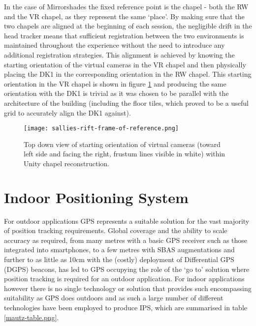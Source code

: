 In the case of Mirrorshades the fixed reference point is the chapel - both the RW and the VR chapel, as they represent the same `place'. By making sure that the two chapels are aligned at the beginning of each session, the negligible drift in the head tracker means that sufficient registration between the two environments is maintained throughout the experience without the need to introduce any additional registration strategies. This alignment is achieved by knowing the starting orientation of the virtual cameras in the VR chapel and then physically placing the DK1 in the corresponding orientation in the RW chapel. This starting orientation in the VR chapel is shown in figure \ref{sallies-rift-frame-of-reference.png} and producing the same orientation with the DK1 is trivial as it was chosen to be parallel with the architecture of the building (including the floor tiles, which proved to be a useful grid to accurately align the DK1 against).

\begin{figure}
	\begin{center}
		\texttt{[image: sallies-rift-frame-of-reference.png]}
		\caption{Top down view of starting orientation of virtual cameras (toward left side and facing the right, frustum lines visible in white) within Unity chapel reconstruction.}
		\label{sallies-rift-frame-of-reference.png}
	\end{center}
\end{figure}


\section{Indoor Positioning System}

For outdoor applications GPS represents a suitable solution for the vast majority of position tracking requirements. Global coverage and the ability to scale accuracy as required, from many metres with a basic GPS receiver such as those integrated into smartphones, to a few metres with SBAS augmentations and further to as little as 10cm with the (costly) deployment of Differential GPS (DGPS) beacons, has led to GPS occupying the role of the `go to' solution where position tracking is required for an outdoor application. For indoor applications however there is no single technology or solution that provides such encompassing suitability as GPS does outdoors and as such a large number of different technologies have been employed to produce IPS, which are summarised in table \ref{mautz-table.png}.

